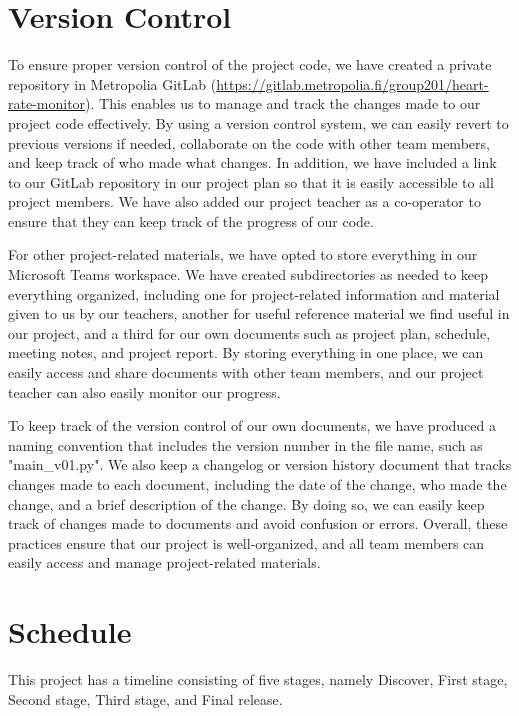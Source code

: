 \documentclass{article}
\begin{document}
\section{Version Control}
To ensure proper version control of the project code, we have created a private repository in Metropolia GitLab (\href{https://gitlab.metropolia.fi/group201/heart-rate-monitor}{https://gitlab.metropolia.fi/group201/heart-rate-monitor}). This enables us to manage and track the changes made to our project code effectively. By using a version control system, we can easily revert to previous versions if needed, collaborate on the code with other team members, and keep track of who made what changes. In addition, we have included a link to our GitLab repository in our project plan so that it is easily accessible to all project members. We have also added our project teacher as a co-operator to ensure that they can keep track of the progress of our code.



For other project-related materials, we have opted to store everything in our Microsoft Teams workspace. We have created subdirectories as needed to keep everything organized, including one for project-related information and material given to us by our teachers, another for useful reference material we find useful in our project, and a third for our own documents such as project plan, schedule, meeting notes, and project report. By storing everything in one place, we can easily access and share documents with other team members, and our project teacher can also easily monitor our progress.

To keep track of the version control of our own documents, we have produced a naming convention that includes the version number in the file name, such as "main\_v01.py". We also keep a changelog or version history document that tracks changes made to each document, including the date of the change, who made the change, and a brief description of the change. By doing so, we can easily keep track of changes made to documents and avoid confusion or errors. Overall, these practices ensure that our project is well-organized, and all team members can easily access and manage project-related materials.

\section{Schedule}

This project has a timeline consisting of five stages, namely Discover, First stage, Second stage, Third stage, and Final release.
\end{document}
